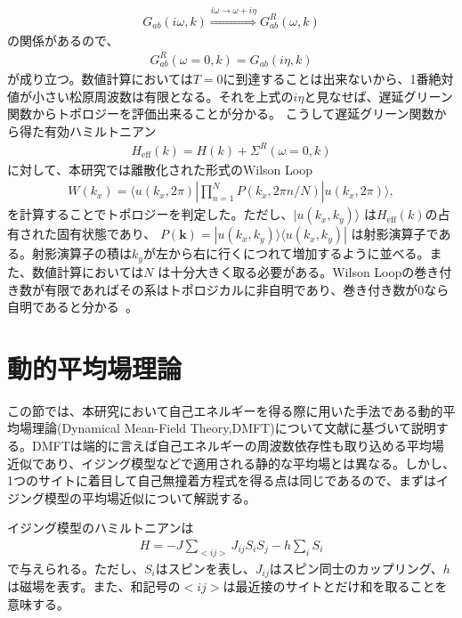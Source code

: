 \documentclass[12pt]{jsbook}
\newcommand{\bk}{\bm{k}}
\begin{document}
\begin{eqnarray}
    G_{ab}(i\omega,k) \overset{i\omega\to \omega+i\eta}{\Longrightarrow}G^{R}_{ab}(\omega,k)
\end{eqnarray}
の関係があるので、
\begin{eqnarray}
    G^{R}_{ab}(\omega=0,k)=G_{ab}(i\eta,k)
\end{eqnarray}
が成り立つ。数値計算においては$T=0$に到達することは出来ないから、1番絶対値が小さい松原周波数は有限となる。それを上式の$i\eta$と見なせば、遅延グリーン関数からトポロジーを評価出来ることが分かる。
こうして遅延グリーン関数から得た有効ハミルトニアン
\begin{eqnarray}
    H_{\mathrm{eff}}(k) = H(k) + \Sigma^{R}(\omega=0,k)
\end{eqnarray}
に対して、本研究では離散化された形式のWilson Loop\cite{asboth2016short,PhysRevB.99.045140,PhysRevB.100.195135}
\begin{eqnarray}
W(k_x) =\langle u(k_x,2\pi)| \displaystyle \prod_{n=1}^{N}P(k_x,2\pi n/N) |u(k_x, 2\pi)\rangle,
\end{eqnarray}
を計算することでトポロジーを判定した。ただし、$|u(k_x,k_y)\rangle$ は$H_{\mathrm{eff}}(k)$の占有された固有状態であり、 $P(\bk)=|u(k_x,k_y)\rangle\langle u(k_x,k_y)|$ は射影演算子である。射影演算子の積は$k_y$が左から右に行くにつれて増加するように並べる。また、数値計算においては$N$ は十分大きく取る必要がある。Wilson Loopの巻き付き数が有限であればその系はトポロジカルに非自明であり、巻き付き数が$0$なら自明であると分かる~\cite{asboth2016short,PhysRevB.99.045140,PhysRevB.100.195135}。

\section{動的平均場理論}%
この節では、本研究において自己エネルギーを得る際に用いた手法である動的平均場理論(Dynamical Mean-Field Theory,DMFT)について文献\cite{RevModPhys.68.13}に基づいて説明する。DMFTは端的に言えば自己エネルギーの周波数依存性も取り込める平均場近似であり、イジング模型などで適用される静的な平均場とは異なる。しかし、1つのサイトに着目して自己無撞着方程式を得る点は同じであるので、まずはイジング模型の平均場近似について解説する。

イジング模型のハミルトニアンは
\begin{eqnarray}
    H=-J\displaystyle\sum_{<ij>}J_{ij}S_iS_j -h\sum_i S_i
\end{eqnarray}
で与えられる。ただし、$S_i$はスピンを表し、$J_{ij}$はスピン同士のカップリング、$h$は磁場を表す。また、和記号の$<ij>$は最近接のサイトとだけ和を取ることを意味する。
\end{document}
